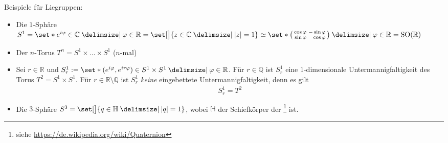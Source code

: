 Beispiele für Liegruppen: 
\begin{itemize}
	\item Die $1$-Sphäre $S^1 = \set*{e^{i \varphi} \in \mathbb{C} \given \varphi \in \mathbb{R}} = \set[\big]{z \in \mathbb{C} \given \abs*{z}=1} \simeq \set*{\begin{psmallmatrix*}[r]
		\cos \varphi & - \sin \varphi \\
		\sin \varphi & \cos \varphi
	\end{psmallmatrix*} \given \varphi \in \mathbb{R}} = \SO(\mathbb{R})$
	\item Der $n$-Torus $T^n = S^1 \times \ldots \times S^1 $ ($n$-mal)
	\item Sei $r \in \mathbb{R}$ und $S^1_r := \set*{\enbrace{e^{i \varphi}, e^{i r \varphi}} \in S^1 \times S^1 \given \varphi \in \mathbb{R}}$.
	Für $r \in \mathbb{Q}$ ist $S^1_r$ eine $1$-dimensionale Untermannigfaltigkeit des Torus $T^2= S^1 \times S^1$.
	Für $r \in \mathbb{R} \setminus \mathbb{Q}$ ist $S^1_r$ \emph{keine} eingebettete Untermannigfaltigkeit, denn es gilt 
	\[
		\overline{S^1_r} = T^2
	\]
	\item Die $3$-Sphäre $S^3 = \set[\big]{q \in \mathbb{H} \given \abs*{q}=1}$, wobei $\mathbb{H}$ der Schiefkörper der \footnote{siehe \url{https://de.wikipedia.org/wiki/Quaternion}} ist.
	

\end{itemize}
